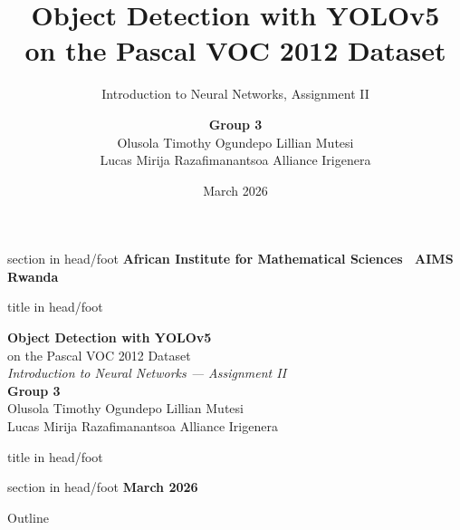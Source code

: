 \documentclass[aspectratio=169, 10pt]{beamer}
\title[Object Detection: Group 3]{%
  \textbf{Object Detection with YOLOv5}\\
  \large on the Pascal VOC 2012 Dataset}
\subtitle{Introduction to Neural Networks, Assignment II}
\author[Group 3]{%
  \textbf{Group 3}\\[2pt]
  \small Olusola Timothy Ogundepo \quad Lillian Mutesi\\
  \small Lucas Mirija Razafimanantsoa \quad Alliance Irigenera}
\institute[AIMS Rwanda]{%
  African Institute for Mathematical Sciences\\
  AIMS Rwanda, Kigali}
\date{March 2026}
\begin{document}
\makeatletter
\begin{frame}[plain, t]
  \vspace*{-0.4cm}%
  \noindent\hspace*{-\beamer@leftmargin}%
  \begin{beamercolorbox}[wd=\paperwidth, ht=2.2cm, dp=0pt, center, sep=0.65cm]{section in head/foot}
    {\bfseries\normalsize African Institute for Mathematical Sciences \textbar\ AIMS Rwanda}
  \end{beamercolorbox}%
  \par\nointerlineskip
  \noindent\hspace*{-\beamer@leftmargin}%
  \begin{beamercolorbox}[wd=\paperwidth, ht=0.28cm, dp=0pt]{title in head/foot}
  \end{beamercolorbox}%
  \vspace{0.7cm}
  \begin{center}
    {\color{aimsblue}\LARGE\bfseries Object Detection with YOLOv5}\\[5pt]
    {\large\color{midgray} on the Pascal VOC 2012 Dataset}\\[10pt]
    {\color{aimsgold}\normalsize\itshape Introduction to Neural Networks --- Assignment II}\\[16pt]
    {\small\bfseries Group 3}\\[4pt]
    {\small Olusola Timothy Ogundepo \quad Lillian Mutesi}\\[2pt]
    {\small Lucas Mirija Razafimanantsoa \quad Alliance Irigenera}
  \end{center}
  \vfill
  \noindent\hspace*{-\beamer@leftmargin}%
  \begin{beamercolorbox}[wd=\paperwidth, ht=0.28cm, dp=0pt]{title in head/foot}
  \end{beamercolorbox}%
  \par\nointerlineskip
  \noindent\hspace*{-\beamer@leftmargin}%
  \begin{beamercolorbox}[wd=\paperwidth, ht=0.9cm, dp=0pt, center, sep=0.2cm]{section in head/foot}
    {\small\bfseries March 2026}
  \end{beamercolorbox}%
\end{frame}
\makeatother

\begin{frame}{Outline}
\tableofcontents
\end{frame}
\end{document}
